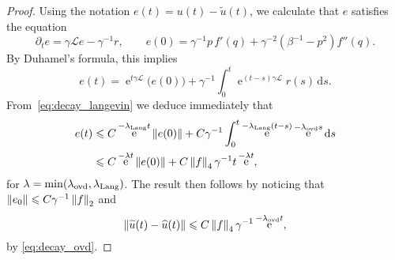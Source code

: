 \documentclass[11pt,a4paper]{article}
\DeclareMathOperator{\e}{e}
\renewcommand{\d}{\mathrm d}
\theoremstyle{plain}
\numberwithin{equation}{section}
\renewcommand{\leq}{\leqslant}
\begin{document}
\begin{proof}
    Using the notation $e(t) = u(t) - \widetilde u(t)$,
    we calculate that $e$ satisfies the equation
    \[
        \partial_t e = \gamma \mathcal L e - \gamma^{-1} r, \qquad
        e(0) = \gamma^{-1} p \, f'(q) + \gamma^{-2} (\beta^{-1} - p^2) f''(q).
    \]
    By Duhamel's formula,
    this implies
    \[
        e(t) = \e^{t \gamma \mathcal L} \bigl( e(0) \bigr) + \gamma^{-1} \int_{0}^{t} \e^{(t- s) \gamma \mathcal L} r(s) \, \d s.
    \]
    From~\eqref{eq:decay_langevin} we deduce immediately that
    \begin{align*}
        e(t)
        &\leq C \e^{- \lambda_{\rm Lang} t} \norm{e(0)}
        + C \gamma^{-1} \int_{0}^{t} \e^{- \lambda_{\rm Lang} (t-s)} \e^{-\lambda_{\rm ovd} s} \d s \\
        &\leq C \e^{- \lambda t} \norm{e(0)} + C \norm{f}_4 \gamma^{-1} t \e^{- \lambda t},
    \end{align*}
    for $\lambda = \min(\lambda_{\rm ovd}, \lambda_{\rm Lang})$.
    The result then follows by noticing that $\norm{e_0} \leq C \gamma^{-1} \norm{f}_2$ and
    \[
        \norm{\widetilde u(t) - \widehat u(t)} \leq C \norm{f}_4 \gamma^{-1} \e^{- \lambda_{\rm ovd} t},
    \]
    by \eqref{eq:decay_ovd}.
\end{proof}
\end{document}

